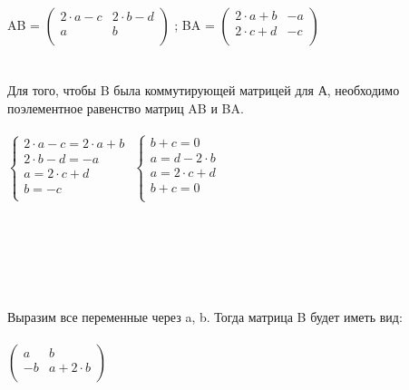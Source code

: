 \documentclass[12pt, a4paper]{article}
\begin{document}
	\\\\\\
	AB = 
	\begin{math}
		\left(
		\begin{array}{rr}
			2 \cdot a - c  & 2 \cdot b - d \\
			a & b \\
		\end{array}
		\right )
	\end{math}
	; BA = 
	\begin{math}
		\left(
		\begin{array}{rr}
			2 \cdot a + b  & -a \\
			2 \cdot c + d & -c \\
		\end{array}
		\right )
	\end{math}
	\\\\\\
	Для того, чтобы B была коммутирующей матрицей для А, необходимо поэлементное равенство матриц AB и BA.
	\\\\
	\begin{math}
		\begin{cases}
			2 \cdot a - c = 2 \cdot a + b\\
			2 \cdot b - d = -a\\
			a = 2 \cdot c + d \\
			b = -c \\
		\end{cases}
	\end{math}
	\begin{math}
		\begin{cases}
			b + c = 0\\
			a = d - 2 \cdot b\\
			a = 2 \cdot c + d \\
			b + c = 0 \\
		\end{cases}
	\end{math}
	\\\\\\\\\\\\\\
	Выразим все переменные через a, b. Тогда матрица B будет иметь вид:
	\\\\
	\begin{math}
		\left(
		\begin{array}{rr}
			a  & b \\
			-b & a + 2 \cdot b \\
		\end{array}
		\right )
	\end{math}
\end{document}
